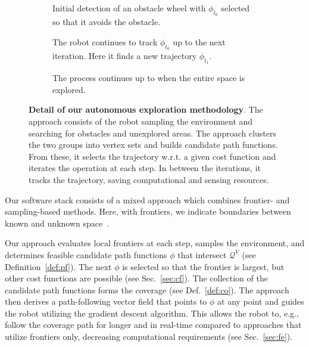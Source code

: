 \documentclass[letterpaper,10pt,conference,twoside]{IEEEtran}
\theoremstyle{definition}
\begin{document}
\begin{figure*}
  \begin{subfigure}[m]{0.33\textwidth}
    \centering
    
    \caption{Initial detection of an obstacle wheel with $\phi_{t_0}$ selected so that it avoids the obstacle.}
    \label{fig:3-1}
  \end{subfigure}
  \hfill
  \begin{subfigure}[m]{0.32\textwidth}
    \centering
    \hspace*{-.15cm}
    
    \caption{The robot continues to track $\phi_{t_0}$ up to the next iteration. Here it finds a new trajectory $\phi_{t_1}$.}
    \label{fig:3-2}
  \end{subfigure}
  \begin{subfigure}[m]{0.33\textwidth}
    \centering
    \hspace*{.05cm}
    
    \caption{The process continues up to when the entire space is explored.}
    \label{fig:3-3}
  \end{subfigure}
  \caption[Detail of our autonomous exploration methodology]{\textbf{Detail of our autonomous exploration methodology}. The %
  approach consists of the robot sampling the environment and searching for obstacles and unexplored areas. The %
  approach clusters the two groups into vertex sets and builds candidate path functions. From these, it selects the %
  trajectory w.r.t. a given cost function and iterates the operation at each step. In between the iterations, it tracks the trajectory, saving computational and sensing resources.}
  \label{fig:3}
\end{figure*}
\noindent
Our software stack %
consists of a mixed approach which combines frontier- and sampling-based methods. 
Here, with frontiers, we indicate %
boundaries between known and unknown space~\cite{%
placed2022survey,dang2019graph}.
%

Our 
approach evaluates local frontiers at each step, samples the environment, and determines feasible candidate path functions $\phi$ that intersect $\mathcal{Q}^V$ (see Definition~\ref{def:pf}).
The next $\phi$ is selected so that the frontier is largest, but other cost functions are possible (see Sec.~\ref{sec:cf}). The collection of the candidate path functions forms the coverage (see Def.~\ref{def:co}).
The %
approach then derives a path-following vector field that points to $\phi$ at any point and guides the robot utilizing the gradient descent algorithm. This allows the robot to, e.g., follow the coverage path for longer and in real-time compared to approaches that utilize frontiers only, decreasing computational requirements (see Sec.~\ref{sec:fe}).
\end{document}
